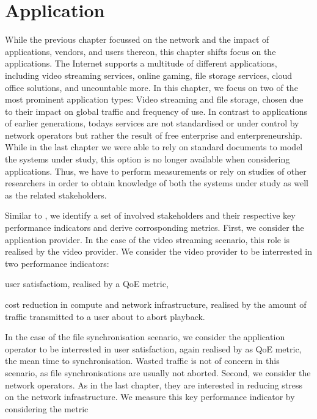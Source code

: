 \chapter{Application}\label{chap:application}

\newcommand{\download}{Download\xspace}
\newcommand{\live}{Live\xspace}
\newcommand{\serviceprovisioning}{Provisioning\xspace}
\newcommand{\streaming}{Streaming\xspace}

While the previous chapter focussed on the network and the impact of applications, vendors, and users thereon, this chapter shifts focus on the applications.
The Internet supports a multitude of different applications, including video streaming services, online gaming, file storage services, cloud office solutions, and uncountable more.
In this chapter, we focus on two of the most prominent application types: Video streaming and file storage, chosen due to their impact on global traffic and frequency of use.
In contrast to applications of earlier generations, todays services are not standardised or under control by network operators but rather the result of free enterprise and enterpreneurship.
While in the last chapter we were able to rely on standard documents to model the systems under study, this option is no longer available when considering applications.
Thus, we have to perform measurements or rely on studies of other researchers in order to obtain knowledge of both the systems under study as well as the related stakeholders.

Similar to , we identify a set of involved stakeholders and their respective key performance indicators and derive corrosponding metrics.
First, we consider the application provider. 
In the case of the video streaming scenario, this role is realised by the video provider.
We consider the video provider to be interrested in two performance indicators: 
\begin{enumerate*}
\item user satisfactiom, realised by a \gls{QoE} metric,
\item cost reduction in compute and network infrastructure, realised by the amount of traffic transmitted to a user about to abort playback.
\end{enumerate*}
In the case of the file synchronisation scenario, we consider the application operator to be interrested in user satisfaction, again realised by as \gls{QoE} metric, the mean time to synchronisation.
Wasted traffic is not of concern in this scenario, as file synchronisations are usually not aborted.
Second, we consider the network operators.
As in the last chapter, they are interested in reducing stress on the network infrastructure.
We measure this key performance indicator by considering the metric 

